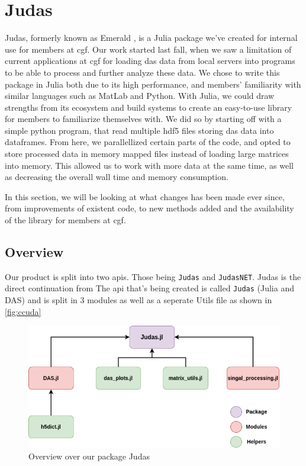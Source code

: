 \section{Judas}
\label{met:Judas}

Judas, formerly known as Emerald \cite{projthesis}, is a Julia package we've created for internal use for members at \acrshort{cgf}. Our work started last fall, when we saw a limitation of current applications at \acrshort{cgf} for loading \acrshort{das} data from local servers into programs to be able to process and further analyze these data. We chose to write this package in Julia both due to its high performance, and members' familiarity with similar languages such as MatLab and Python. With Julia, we could draw strengths from its ecosystem and build systems to create an easy-to-use library for members to familiarize themselves with. We did so by starting off with a simple python program, that read multiple \acrshort{hdf5} files storing \acrshort{das} data into dataframes. From here, we parallellized certain parts of the code, and opted to store processed data in memory mapped files instead of loading large matrices into memory. This allowed us to work with more data at the same time, as well as decreasing the overall wall time and memory consumption.  

In this section, we will be looking at what changes has been made ever since, from improvements of existent code, to new methods added and the availability of the library for members at \acrshort{cgf}. \\

\subsection{Overview}

Our product is split into two apis. Those being \texttt{Judas} and \texttt{JudasNET}. Judas is the direct continuation from \cite{projthesis}
The \acrshort{api} that's being created is called \texttt{Judas} (Julia and DAS) and is split in 3 modules as well as a seperate Utils file as shown in \ref{fig:ccuda}

\begin{figure}[!h]
    \centering
    \includegraphics[scale=.6]{figures/judas_overview.png}
    \caption{Overview over our package Judas}
    \label{fig:judasoverview}
\end{figure}


